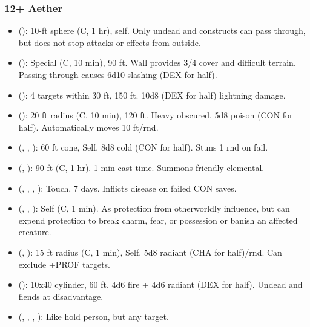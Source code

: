 \subsubsection{12+ Aether}
\begin{itemize}
	\item {} (): 10-ft sphere (C, 1 hr), self. Only undead and constructs can pass through, but does not stop attacks or effects from outside.
	\item {} (): Special (C, 10 min), 90 ft. Wall provides 3/4 cover and difficult terrain. Passing through causes 6d10 slashing (DEX for half).
	\item {} (): 4 targets within 30 ft, 150 ft. 10d8 (DEX for half) lightning damage. 
	\item {} (): 20 ft radius (C, 10 min), 120 ft. Heavy obscured. 5d8 poison (CON for half). Automatically moves 10 ft/rnd. 
	\item {} (, , ): 60 ft cone, Self. 8d8 cold (CON for half). Stuns 1 rnd on fail.
	\item {} (, ): 90 ft (C, 1 hr). 1 min cast time. Summons friendly elemental.
	\item {} (, , , ): Touch, 7 days. Inflicts disease on failed CON saves.
	\item {} (, , ): Self (C, 1 min). As protection from otherworldly influence, but can expend protection to break charm, fear, or possession or banish an affected creature.
	\item {} (, ): 15 ft radius (C, 1 min), Self. 5d8 radiant (CHA for half)/rnd. Can exclude +PROF targets.
	\item {} (): 10x40 cylinder, 60 ft. 4d6 fire + 4d6 radiant (DEX for half). Undead and fiends at disadvantage.
	\item {} (, , , ): Like hold person, but any target.

\end{itemize}
